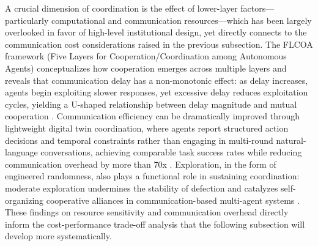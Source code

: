 \documentclass[11pt]{article}
\begin{document}
A crucial dimension of coordination is the effect of lower-layer factors---particularly computational and communication resources---which has been largely overlooked in favor of high-level institutional design, yet directly connects to the communication cost considerations raised in the previous subsection. The FLCOA framework (Five Layers for Cooperation/Coordination among Autonomous Agents) conceptualizes how cooperation emerges across multiple layers and reveals that communication delay has a non-monotonic effect: as delay increases, agents begin exploiting slower responses, yet excessive delay reduces exploitation cycles, yielding a U-shaped relationship between delay magnitude and mutual cooperation \cite{ref91}. Communication efficiency can be dramatically improved through lightweight digital twin coordination, where agents report structured action decisions and temporal constraints rather than engaging in multi-round natural-language conversations, achieving comparable task success rates while reducing communication overhead by more than 70x \cite{ref92}. Exploration, in the form of engineered randomness, also plays a functional role in sustaining coordination: moderate exploration undermines the stability of defection and catalyzes self-organizing cooperative alliances in communication-based multi-agent systems \cite{ref93}. These findings on resource sensitivity and communication overhead directly inform the cost-performance trade-off analysis that the following subsection will develop more systematically.
\end{document}
